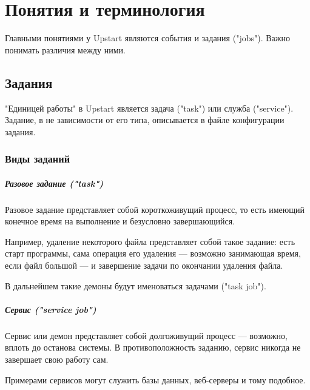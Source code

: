 \chapter{Понятия и терминология}
Главными понятиями у Upstart являются события и задания ("jobs"). Важно понимать различия между ними.
\section{Задания}
"Единицей работы" в Upstart является задача ("task") или служба ("service"). Задание, в не зависимости от его типа, описывается в файле конфигурации задания.
\subsection{Виды заданий}
\paragraph{Разовое задание ("task")}
Разовое задание представляет собой короткоживущий процесс, то есть имеющий конечное время на выполнение и безусловно завершающийся.

Например, удаление некоторого файла представляет собой такое задание: есть старт программы, сама операция его удаления --- возможно занимающая время, если файл большой --- и завершение задачи по окончании удаления файла.

В дальнейшем такие демоны будут именоваться задачами ("task job").

\paragraph{Сервис ("service job")}
Сервис или демон представляет собой долгоживущий процесс --- возможно, вплоть до останова системы. 
В противоположность заданию, сервис никогда не завершает свою работу сам.

Примерами сервисов могут служить базы данных, веб-серверы и тому подобное.